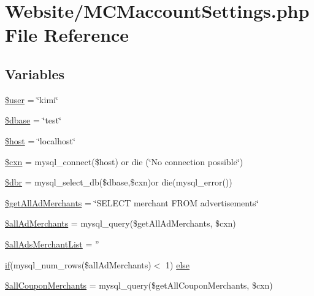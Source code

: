 \hypertarget{_m_c_maccount_settings_8php}{\section{Website/\-M\-C\-Maccount\-Settings.php File Reference}
\label{_m_c_maccount_settings_8php}
}
\subsection*{Variables}
\begin{DoxyCompactItemize}
\item 
\hyperlink{_m_c_maccount_settings_8php_a598ca4e71b15a1313ec95f0df1027ca5}{\$user} = \char`\"{}kimi\char`\"{}
\item 
\hyperlink{_m_c_maccount_settings_8php_abd981912075cb8356ca370b4fefdfed7}{\$dbase} = \char`\"{}test\char`\"{}
\item 
\hyperlink{_m_c_maccount_settings_8php_a711797613cb863ca0756df789c396bf2}{\$host} = \char`\"{}localhost\char`\"{}
\item 
\hyperlink{_m_c_maccount_settings_8php_afe14c5bdb9487c058ec831382f1fbacd}{\$cxn} = mysql\-\_\-connect(\$host) or die (\char`\"{}No connection possible\char`\"{})
\item 
\hyperlink{_m_c_maccount_settings_8php_a88fea670240e5fa6ae306a286acaa0fd}{\$dbr} = mysql\-\_\-select\-\_\-db(\$dbase,\$cxn)or die(mysql\-\_\-error())
\item 
\hyperlink{_m_c_maccount_settings_8php_a0c83e0e6bd8e9d8deee8baa4f03f6fc2}{\$get\-All\-Ad\-Merchants} = \char`\"{}S\-E\-L\-E\-C\-T merchant F\-R\-O\-M advertisements\char`\"{}
\item 
\hyperlink{_m_c_maccount_settings_8php_a8a13c248d6e767ec3a93debb562f3a3f}{\$all\-Ad\-Merchants} = mysql\-\_\-query(\$get\-All\-Ad\-Merchants, \$cxn)
\item 
\hyperlink{_m_c_maccount_settings_8php_a17349accdafb921446876ffa9476c666}{\$all\-Ads\-Merchant\-List} = ''
\item 
\hyperlink{_m_c_maccount_settings_8php_a648419c218c2f0aeb239028519ab83d8}{if}(mysql\-\_\-num\-\_\-rows(\$all\-Ad\-Merchants)$<$ 1) \hyperlink{_m_c_maccount_settings_8php_a94047f62b6235a950eb5b1c60eecf257}{else}
\item 
\hyperlink{_m_c_maccount_settings_8php_ac2b2cf021ba3f45382a7c009f4a85359}{\$all\-Coupon\-Merchants} = mysql\-\_\-query(\$get\-All\-Coupon\-Merchants, \$cxn)
\item 

\end{DoxyCompactItemize}

